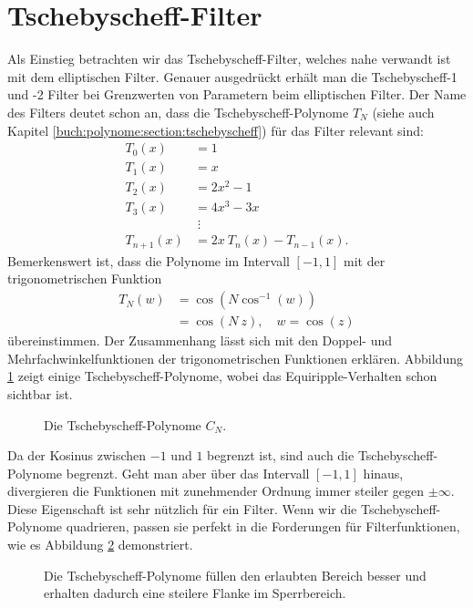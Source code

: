 \section{Tschebyscheff-Filter}

Als Einstieg betrachten wir das Tschebyscheff-Filter, welches nahe verwandt ist mit dem elliptischen Filter.
%
Genauer ausgedrückt erhält man die Tschebyscheff-1 und -2 Filter bei Grenzwerten von Parametern beim elliptischen Filter.
Der Name des Filters deutet schon an, dass die Tschebyscheff-Polynome $T_N$ (siehe auch Kapitel \ref{buch:polynome:section:tschebyscheff}) für das Filter relevant sind:
\begin{align*}
    T_{0}(x)&=1\\
    T_{1}(x)&=x\\
    T_{2}(x)&=2x^{2}-1\\
    T_{3}(x)&=4x^{3}-3x\\[-2pt]
&\;\vdots\\
    T_{n+1}(x)&=2x~T_{n}(x)-T_{n-1}(x).
\end{align*}
Bemerkenswert ist, dass die Polynome im Intervall $[-1, 1]$ mit der trigonometrischen Funktion
\begin{align} \label{ellfilter:eq:chebychef_polynomials}
    T_N(w) &= \cos \left( N \cos^{-1}(w) \right) \\
           &= \cos \left(N~z \right), \quad w= \cos(z) \label{ellfilter:eq:chebychef_polynomials2}
\end{align}
übereinstimmen.
Der Zusammenhang lässt sich mit den Doppel- und Mehrfachwinkelfunktionen der trigonometrischen Funktionen erklären.
Abbildung \ref{ellfilter:fig:chebychef_polynomials} zeigt einige Tschebyscheff-Polynome, wobei das Equiripple-Verhalten schon sichtbar ist.
\begin{figure}
    \centering
    
    \caption{Die Tschebyscheff-Polynome $C_N$.}
    \label{ellfilter:fig:chebychef_polynomials}
\end{figure}
Da der Kosinus zwischen $-1$ und $1$ begrenzt ist, sind auch die Tschebyscheff-Polynome begrenzt.
Geht man aber über das Intervall $[-1, 1]$ hinaus, divergieren die Funktionen mit zunehmender Ordnung immer steiler gegen $\pm \infty$.
Diese Eigenschaft ist sehr nützlich für ein Filter.
Wenn wir die Tschebyscheff-Polynome quadrieren, passen sie perfekt in die Forderungen für Filterfunktionen, wie es Abbildung \ref{ellfiter:fig:chebychef} demonstriert.
\begin{figure}
    \centering
    
    \caption{Die Tschebyscheff-Polynome füllen den erlaubten Bereich besser und erhalten dadurch eine steilere Flanke im Sperrbereich.}
    \label{ellfiter:fig:chebychef}
\end{figure}

